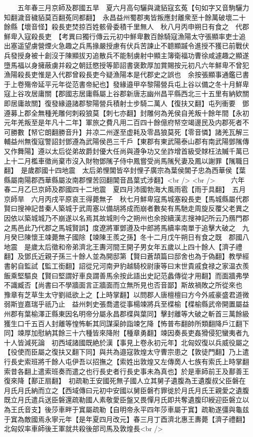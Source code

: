 　　五年春三月京師及郡國五旱　夏六月高句驪與濊貊寇玄菟【句如字又音駒驪力知翻濊音穢貊莫百翻菟同都翻】　永昌益州蜀郡夷皆叛應封離衆至十餘萬破壞二十餘縣【壞音怪】殺長吏焚掠百姓骸骨委積千里無人　秋八月丙申朔日有食之　代郡鮮卑入寇殺長吏　【考異曰獨行傳云元初中鮮卑數百餘騎寇漁陽太守張顯率吏士追出塞遥望虜營煙火急趣之兵馬掾嚴授慮有伏兵苦諫止不聼顯䠞令進授不獲已前戰伏兵發授身被十創沒于陳顯拔刃追散兵不能制虜射中顯主簿衛福功曹徐咸遽趣之顯遂墮馬福以身擁蔽虜并殺之朝廷愍授等節詔書褒歎厚加賞賜按元初凡六年鮮卑不曾犯漁陽殺長吏惟是入代郡曾殺長吏今疑漁陽本是代郡史之誤也　余按張顯事通鑑已書于上卷殤帝延平元年從范書帝紀也】發緣邉甲卒黎陽營兵屯上谷以備之冬十月鮮卑寇上谷攻居庸關【郡國志居庸縣屬上谷郡新唐志幽州昌平縣西北三十五里有納欵關即居庸故關】復發緣邉諸郡黎陽營兵積射士步騎二萬人【復扶又翻】屯列衝要　鄧遵募上郡全無種羌雕何刺殺狼莫【刺七亦翻】封雕何為羌侯自羌叛十餘年間【永初元年羌叛至是年凡十二年】軍旅之費凡用二百四十餘億府帑空竭邊民及内郡死者不可勝數【帑它朗翻勝音升】并凉二州遂至虚耗及零昌狼莫死【零音憐】諸羌瓦解三輔益州無復寇警詔封鄧遵為武陽侯邑三千戶【東郡有東武陽泰山郡有南武陽鄧隲傳又作舞陽】遵以太后從弟故爵封優大任尚與遵争功又坐詐增首級受賕枉法贓千萬已上十二月檻車徵尚棄市沒入財物鄧隲子侍中鳳嘗受尚馬隲髠妻及鳳以謝罪【隲職日翻】　是歲郡國十四地震　太后弟悝閶皆卒封悝子廣宗為葉侯閶子忠為西華侯【葉縣屬南陽郡西華縣屬汝南郡悝苦回翻閶音昌葉式涉翻】<br />
<br />
　　六年春二月乙巳京師及郡國四十二地震　夏四月沛國勃海大風雨雹【雨于具翻】　五月京師旱　六月丙戌平原哀王得薨無子　秋七月鮮卑寇馬城塞殺長吏【馬城縣屬代郡賢曰搜神記昔秦人築城于武周塞以備胡將成而崩者數矣有馬馳走周旋反覆父老異之因依以築城城乃不崩遂以名焉其故城則今之朔州也余按續漢志搜神記所云乃鴈門郡之馬邑此乃代郡之馬城賢誤】度遼將軍鄧遵及中郎將馬續率南單于追擊大破之　九月癸巳陳懷王竦薨無子國除【竦陳王羨之孫】冬十二月戊午朔日有食之既　郡國八地震　是歲太后徵和帝弟濟北王夀河間王開子男女年五歲以上四十餘人【濟子禮翻】及鄧氏近親子孫三十餘人並為開邸第【賢曰蒼頡篇曰邸舍也為于偽翻】教學經書躬自監試【監工銜翻】詔從兄河南尹豹越騎校尉康等曰末世貴戚食禄之家温衣羨飯乘堅驅良【賢曰堅謂好車良謂善馬余按此語出史記范蠡傳從才用翻】而面牆弗學不識臧否【尚書曰不學牆面言正牆面而立無所見也否音鄙】斯故禍敗之所從來也　豫章有芝草生太守劉祗欲上之【上時掌翻】以問郡人唐檀檀曰方今外戚豪盛君道微弱斯豈嘉瑞乎祇乃止　益州刺史張喬遣從事楊竦將兵至楪榆【楪榆縣武帝開置屬益州郡有葉榆澤正縣東因名明帝分屬永昌郡楪與葉同】擊封離等大破之斬首三萬餘級獲生口千五百人封離等惶怖斬其同謀渠帥詣竦乞降【怖普布翻帥所類翻降戶江翻下同】竦厚加慰納其餘三十六種皆來降附【種章勇翻】竦因奏長吏姦猾侵犯蠻夷者九十人皆減死論　初西域諸國既絶於漢【事見上卷永初元年】北匈奴復以兵威役屬之【役使而臣屬之復扶又翻下同】與共為邉寇敦煌太守曹宗患之【敦徒門翻】乃上遣行長史索班將千餘人屯伊吾以招撫之【索姓出敦煌又左傳啇人七族有索氏上時掌翻索昔各翻上遣索班奏而遣之也行長史者行長史事未為真也】於是車師前王及鄯善王復來降【鄯正扇翻】　初疏勒王安國死無子國人立其舅子遺腹為王遺腹叔父臣磐在月氏月氏納而立之【西域傳曰元初中安國以舅臣磐冇罪徙於月氏月氏王親愛之遺腹既立月氏遣兵送臣磐還疏勒國人素敬愛臣盤又畏憚月氏即共奪遺腹印綬迎臣磐立以為王氏音支】後莎車畔于窴屬疏勒【自明帝永平四年莎車屬于窴】疏勒遂彊與龜兹于窴為敵國焉永寧元年【是年夏四月改元】春三月丁酉濟北惠王夀薨【濟子禮翻】北匈奴率車師後王軍就共殺後部司馬及敦煌長<br />
